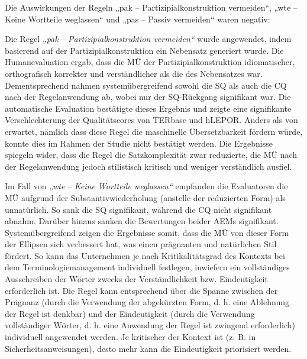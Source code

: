 Die Auswirkungen der Regeln „pak -- Partizipialkonstruktion vermeiden“, „wte -- Keine Wortteile weglassen“ und „pas -- Passiv vermeiden“ waren negativ:

Die Regel \textit{„pak} -- \textit{Partizipialkonstruktion vermeiden“} wurde angewendet, indem basierend auf der Partizipialkonstruktion ein Nebensatz generiert wurde. Die Humanevaluation ergab, dass die MÜ der Partizipialkonstruktion idiomatischer, orthografisch korrekter und verständlicher als die des Nebensatzes war. Dementsprechend nahmen systemübergreifend sowohl die SQ als auch die CQ nach der Regelanwendung ab, wobei nur der SQ-Rückgang signifikant war. Die automatische Evaluation bestätigte dieses Ergebnis und zeigte eine signifikante Verschlechterung der Qualitätscores von TERbase und hLEPOR. Anders als von \citet{BernthGdaniec2001} erwartet, nämlich dass diese Regel die maschinelle Übersetzbarkeit fördern würde, konnte dies im Rahmen der Studie nicht bestätigt werden. Die Ergebnisse spiegeln wider, dass die Regel die Satzkomplexität zwar reduzierte, die MÜ nach der Regelanwendung jedoch stilistisch kritisch und weniger verständlich ausfiel.

Im Fall von \textit{„wte} -- \textit{Keine Wortteile weglassen“} empfanden die Evaluatoren die MÜ aufgrund der Substantivwiederholung (anstelle der reduzierten Form) als unnatürlich. So sank die SQ signifikant, während die CQ nicht signifikant abnahm. Darüber hinaus sanken die Bewertungen beider AEMs signifikant. Systemübergreifend zeigen die Ergebnisse somit, dass die MÜ von dieser Form der Ellipsen sich verbessert hat, was einen prägnanten und natürlichen Stil fördert. So kann das Unternehmen je nach Kritikalitätsgrad des Kontexts bei dem Terminologiemanagement individuell festlegen, inwiefern ein vollständiges Ausschreiben der Wörter zwecks der Verständlichkeit bzw. Eindeutigkeit erforderlich ist. Die Regel kann entsprechend über die Spanne zwischen der Prägnanz (durch die Verwendung der abgekürzten Form, d. h. eine Ablehnung der Regel ist denkbar) und der Eindeutigkeit (durch die Verwendung vollständiger Wörter, d. h. eine Anwendung der Regel ist zwingend erforderlich) individuell angewendet werden. Je kritischer der Kontext ist (z. B. in Sicherheitsanweisungen), desto mehr kann die Eindeutigkeit priorisiert werden.

